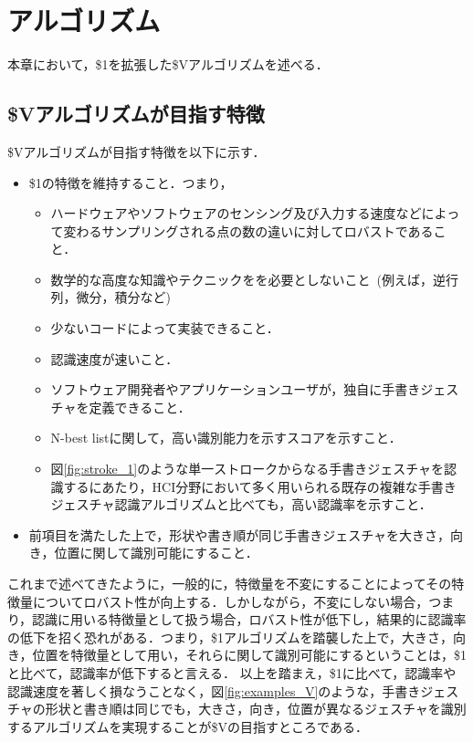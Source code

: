 \chapter{\SysName アルゴリズム}
本章において，\$1を拡張した\$Vアルゴリズムを述べる．

\section{\$Vアルゴリズムが目指す特徴}
\$Vアルゴリズムが目指す特徴を以下に示す．
\begin{itemize}
\item \$1の特徴を維持すること．つまり，
\begin{itemize}
\item ハードウェアやソフトウェアのセンシング及び入力する速度などによって変わるサンプリングされる点の数の違いに対してロバストであること．
\item 数学的な高度な知識やテクニックをを必要としないこと~(例えば，逆行列，微分，積分など)
\item 少ないコードによって実装できること．
\item 認識速度が速いこと．
\item ソフトウェア開発者やアプリケーションユーザが，独自に手書きジェスチャを定義できること．
\item N-best listに関して，高い識別能力を示すスコアを示すこと．
\item 図\ref{fig:stroke_1}のような単一ストロークからなる手書きジェスチャを認識するにあたり，HCI分野において多く用いられる既存の複雑な手書きジェスチャ認識アルゴリズムと比べても，高い認識率を示すこと．
\end{itemize}
\item 前項目を満たした上で，形状や書き順が同じ手書きジェスチャを大きさ，向き，位置に関して識別可能にすること．
\end{itemize}

これまで述べてきたように，一般的に，特徴量を不変にすることによってその特徴量についてロバスト性が向上する．しかしながら，不変にしない場合，つまり，認識に用いる特徴量として扱う場合，ロバスト性が低下し，結果的に認識率の低下を招く恐れがある．つまり，\$1アルゴリズムを踏襲した上で，大きさ，向き，位置を特徴量として用い，それらに関して識別可能にするということは，\$1と比べて，認識率が低下すると言える．
以上を踏まえ，\$1に比べて，認識率や認識速度を著しく損なうことなく，図\ref{fig:examples_V}のような，手書きジェスチャの形状と書き順は同じでも，大きさ，向き，位置が異なるジェスチャを識別するアルゴリズムを実現することが\$Vの目指すところである．

